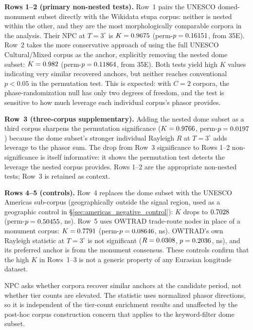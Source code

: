 \noindent\textbf{Rows 1--2 (primary non-nested tests).}
Row~1 pairs the UNESCO domed-monument subset directly with the Wikidata
stupa corpus: neither is nested within the other, and they are
the most morphologically comparable corpora in the analysis. Their NPC
at $T=3^\circ$ is $K=0.9675{}$
(perm-$p=0.16151{}$, \npcDomeStupaGridDeltaE\textdegree{}
from 35\textdegree{}E). Row~2 takes the more conservative approach of
using the full UNESCO Cultural/Mixed corpus as the anchor, explicitly
removing the nested dome subset: $K=0.982{}$
(perm-$p=0.11864{}$, \npcTwoGridDeltaE\textdegree{} from
35\textdegree{}E). Both tests yield high $K$ values indicating very
similar recovered anchors, but neither reaches conventional $p<0.05$
in the permutation test. This is expected: with $C=2$ corpora, the
phase-randomization null has only two degrees of freedom, and the test
is sensitive to how much leverage each individual corpus's phasor
provides.

\noindent\textbf{Row~3 (three-corpus supplementary).}
Adding the nested dome subset as a third corpus sharpens the permutation
significance ($K=0.9766{}$, perm-$p=0.0197{}$) because the
dome subset's stronger individual Rayleigh $R$ at $T=3^\circ$ adds
leverage to the phasor sum. The drop from Row~3 significance to Rows 1--2
non-significance is itself informative: it shows the permutation test
detects the leverage the nested corpus provides. Rows 1--2 are the
appropriate non-nested tests; Row~3 is retained as context.

\noindent\textbf{Rows 4--5 (controls).}
Row~4 replaces the dome subset with the UNESCO Americas sub-corpus
(geographically outside the signal region, used as a geographic control
in \S\ref{sec:americas_negative_control}): $K$ drops to
$0.7028{}$ (perm-$p=0.50455{}$, ns). Row~5 uses
OWTRAD trade-route nodes in place of a monument corpus:
$K=0.7791{}$ (perm-$p=0.08646{}$, ns). OWTRAD's own Rayleigh
statistic at $T=3^\circ$ is not significant
($R=0.0308{}$, $p=0.2036{}$, ns), and its preferred anchor
is \npcOwAnchorDelta\textdegree{} from the monument consensus. These
controls confirm that the high $K$ in Rows~1--3 is not a
generic property of any Eurasian longitude dataset.

NPC asks whether corpora recover similar anchors at the candidate
period, not whether tier counts are elevated. The statistic uses
normalized phasor directions, so it is independent of the tier-count
enrichment results and unaffected by the post-hoc corpus construction
concern that applies to the keyword-filter dome subset.

